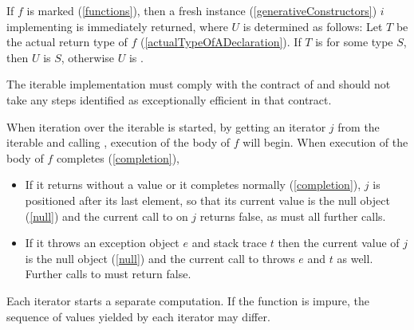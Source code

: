 \documentclass[makeidx]{article}
\begin{document}
\LMHash{}%
If $f$ is marked \code{\SYNC*} (\ref{functions}),
then a fresh instance (\ref{generativeConstructors}) $i$
implementing  is immediately returned,
where $U$ is determined as follows:
Let $T$ be the actual return type of $f$ (\ref{actualTypeOfADeclaration}).
If $T$ is  for some type $S$, then $U$ is $S$,
otherwise $U$ is .


\LMHash{}%
The iterable implementation must comply with the contract of  and should not take any steps identified as exceptionally efficient in that contract.


\LMHash{}%
When iteration over the iterable is started, by getting an iterator $j$ from the iterable and calling , execution of the body of $f$ will begin.
When execution of the body of $f$ completes (\ref{completion}),
\begin{itemize}
\item If it returns without a value or it completes normally (\ref{completion}), $j$ is positioned after its last element, so that its current value is the null object (\ref{null}) and the current call to  on $j$ returns false, as must all further calls.
\item If it throws an exception object $e$ and stack trace $t$ then the current value of $j$ is the null object (\ref{null}) and the current call to  throws $e$ and $t$ as well.
Further calls to  must return false.
\end{itemize}

Each iterator starts a separate computation.
If the \code{\SYNC*} function is impure, the sequence of values yielded by each iterator may differ.
\end{document}
